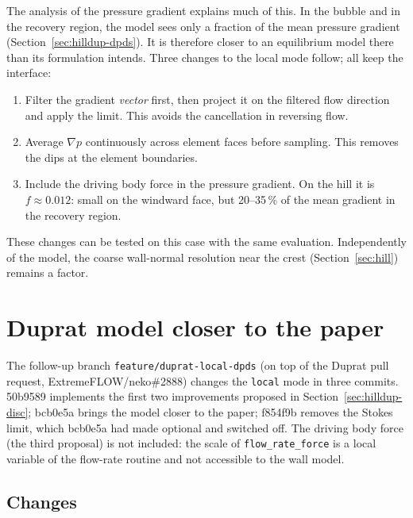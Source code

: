 \documentclass[11pt,a4paper]{article}
\newcommand{\code}[1]{\texttt{#1}}
\begin{document}
The analysis of the pressure gradient explains much of this. In the bubble
and in the recovery region, the model sees only a fraction of the mean
pressure gradient (Section~\ref{sec:hilldup-dpds}). It is therefore closer
to an equilibrium model there than its formulation intends. Three changes to
the local mode follow; all keep the interface:
\begin{enumerate}
  \item Filter the gradient \emph{vector} first, then project it on the
    filtered flow direction and apply the limit. This avoids the cancellation
    in reversing flow.
  \item Average $\nabla p$ continuously across element faces before
    sampling. This removes the dips at the element boundaries.
  \item Include the driving body force in the pressure gradient. On the
    hill it is $f \approx 0.012$: small on the windward face, but 20--35\,\%
    of the mean gradient in the recovery region.
\end{enumerate}
These changes can be tested on this case with the same evaluation.
Independently of the model, the coarse wall-normal resolution near the crest
(Section~\ref{sec:hill}) remains a factor.

\section{Duprat model closer to the paper}
\label{sec:dupv2}

The follow-up branch \code{feature/duprat-local-dpds} (on top of the Duprat
pull request, ExtremeFLOW/neko\#2888) changes the \code{local} mode in three
commits. 50b9589 implements the first two improvements proposed in
Section~\ref{sec:hilldup-disc}; bcb0e5a brings the model closer to the
paper; f854f9b removes the Stokes limit, which bcb0e5a had made optional and
switched off. The driving body force (the third proposal) is not included: the
scale of \code{flow\_rate\_force} is a local variable of the flow-rate
routine and not accessible to the wall model.

\subsection{Changes}
\end{document}

